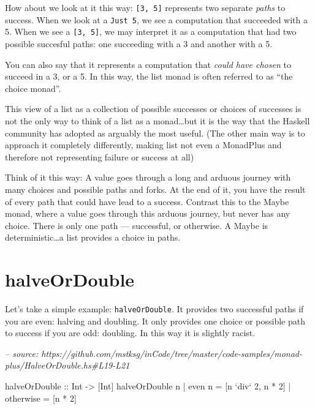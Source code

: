 \documentclass[]{article}
\newenvironment{Shaded}{}{}
\newcommand{\CommentTok}[1]{\textcolor[rgb]{0.38,0.63,0.69}{\textit{#1}}}
\newcommand{\DataTypeTok}[1]{\textcolor[rgb]{0.56,0.13,0.00}{#1}}
\newcommand{\DecValTok}[1]{\textcolor[rgb]{0.25,0.63,0.44}{#1}}
\newcommand{\FunctionTok}[1]{\textcolor[rgb]{0.02,0.16,0.49}{#1}}
\newcommand{\NormalTok}[1]{#1}
\newcommand{\OtherTok}[1]{\textcolor[rgb]{0.00,0.44,0.13}{#1}}
\begin{document}
How about we look at it this way: \texttt{{[}3,\ 5{]}} represents two separate
\emph{paths} to success. When we look at a \texttt{Just\ 5}, we see a
computation that succeeded with a 5. When we see a \texttt{{[}3,\ 5{]}}, we may
interpret it as a computation that had two possible succesful paths: one
succeeding with a 3 and another with a 5.

You can also say that it represents a computation that \emph{could have chosen}
to succeed in a 3, or a 5. In this way, the list monad is often referred to as
``the choice monad''.

This view of a list as a collection of possible successes or choices of
successes is not the only way to think of a list as a monad\ldots{}but it is the
way that the Haskell community has adopted as arguably the most useful. (The
other main way is to approach it completely differently, making list not even a
MonadPlus and therefore not representing failure or success at all)

Think of it this way: A value goes through a long and arduous journey with many
choices and possible paths and forks. At the end of it, you have the result of
every path that could have lead to a success. Contrast this to the Maybe monad,
where a value goes through this arduous journey, but never has any choice. There
is only one path --- successful, or otherwise. A Maybe is deterministic\ldots{}a
list provides a choice in paths.

\hypertarget{halveordouble}{%
\section{halveOrDouble}\label{halveordouble}}

Let's take a simple example: \texttt{halveOrDouble}. It provides two successful
paths if you are even: halving and doubling. It only provides one choice or
possible path to success if you are odd: doubling. In this way it is slightly
racist.

\begin{Shaded}
\begin{Highlighting}[]
\CommentTok{-- source: https://github.com/mstksg/inCode/tree/master/code-samples/monad-plus/HalveOrDouble.hs#L19-L21}

\OtherTok{halveOrDouble ::} \DataTypeTok{Int} \OtherTok{->}\NormalTok{ [}\DataTypeTok{Int}\NormalTok{]}
\NormalTok{halveOrDouble n }\FunctionTok{|}\NormalTok{ even n    }\FunctionTok{=}\NormalTok{ [n }\OtherTok{`div`} \DecValTok{2}\NormalTok{, n }\FunctionTok{*} \DecValTok{2}\NormalTok{]}
                \FunctionTok{|}\NormalTok{ otherwise }\FunctionTok{=}\NormalTok{ [n }\FunctionTok{*} \DecValTok{2}\NormalTok{]}
\end{Highlighting}
\end{Shaded}
\end{document}
